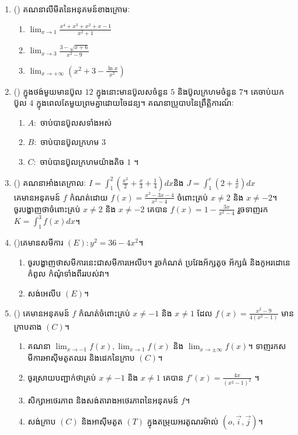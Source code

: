 \documentclass{officialexam}
\begin{document}
\begin{enumerate}[m]
	\item {\color{khtug}()} គណនាលីមីតនៃអនុគមន៍ខាងក្រោមៈ
	\begin{enumerate}[k,3]
		\item $\lim_{x\to 1}\frac{x^4+x^3+x^2+x-1}{x^2+1}$
		\item $\lim_{x\to 3}\frac{3-\sqrt{x+6}}{x^2-9}$
		\item $\lim_{x \to +\infty }\left(x^2+3-\frac{\ln x}{x^2}\right)$
	\end{enumerate}
	\item {\color{khtug}()} ក្នុងថង់មួយមានប៊ូល $12$ ក្នុងនោះមានប៊ូលសចំនួន $5$ និងប៊ូលក្រហមចំនួន $7$។ គេចាប់យកប៊ូល $4$ ក្នុងពេលតែមួយព្រមគ្នាដោយចៃដន្យ។ គណនាប្រូបាបនៃព្រឹត្តិការណ៍ៈ
	\begin{enumerate}[k]
		\item $A:$ ចាប់បានប៊ូលសទាំងអស់
		\item $B:$ ចាប់បានប៊ូលក្រហម $3$
		\item $C:$ ចាប់បានប៊ូលក្រហមយ៉ាងតិច $1$ ។
	\end{enumerate}
	\item {\color{khtug}()} {\color{khtug}} គណនាអាំងតេក្រាលៈ $I=\int_{1}^{2}\left(\frac{x^2}{2}+\frac{x}{3}+\frac{1}{4}\right)dx$\quad និង $J=\int_{1}^{e}\left(2+\frac{4}{x}\right)dx$\\
	 {\color{khtug}} គេមានអនុគមន៍ $f$ កំណត់ដោយ $f(x)=\frac{x^2-3x-4}{x^2-4}$ ចំពោះគ្រប់ $x\ne2$ និង $x\ne-2$។ \\ចូរបង្ហាញថាចំពោះគ្រប់ $x\ne2$ និង $x\ne-2$ គេបាន $f(x)=1-\frac{3x}{x^2-4}$ រួចទាញរក $K=\int_{1}^{3}f(x)dx$។
	\item {\color{khtug}()}​គេមានសមីការ $\left(E\right): y^2=36-4x^2$។
	\begin{enumerate}[k]
		\item ចូរបង្ហាញថាសមីការនេះជាសមីការអេលីប។ រួចកំណត់ ប្រវែងអ័ក្សតូច អ័ក្សធំ និងកូអរដោនេ កំពូល កំណុំទាំងពីររបស់វា។
		\item សង់អេលីប $(E)$។
	\end{enumerate}
	\item {\color{khtug}()} គេមានអនុគមន៍ $f$ កំណត់ចំពោះគ្រប់ $x\ne-1$ និង $x\ne1$ ដែល $f(x)=\frac{x^2-9}{4\left(x^2-1\right)}$ មានក្រាបតាង $\left(C\right)$។
	\begin{enumerate}[k]
		\item គណនា $\lim_{x\to -1}f(x),\lim_{x\to 1}f(x)$ និង $\lim_{x \to \pm\infty }f(x)$។ ទាញរកសមីការអាសុីមតូតឈរ និងដេកនៃក្រាប $\left(C\right)$។
		\item ចូរស្រាយបញ្ជាក់ថាគ្រប់ $x\ne-1$ និង $x\ne1$ គេបាន $f'(x)=\frac{4x}{\left(x^2-1\right)^{2}}$ ។
		\item សិក្សាអថេរភាព និងសង់តារាងអថេរភាពនៃអនុគមន៍ $f$។
		\item សង់ក្រាប $\left(C\right)$ និងអាសុីមតូត  $\left(T\right)$ ក្នុងតម្រុយអរតូណរម៉ាល់ $\left(o,\vec{i},\vec{j}\right)$។
	\end{enumerate}
\end{enumerate}
\end{document}
